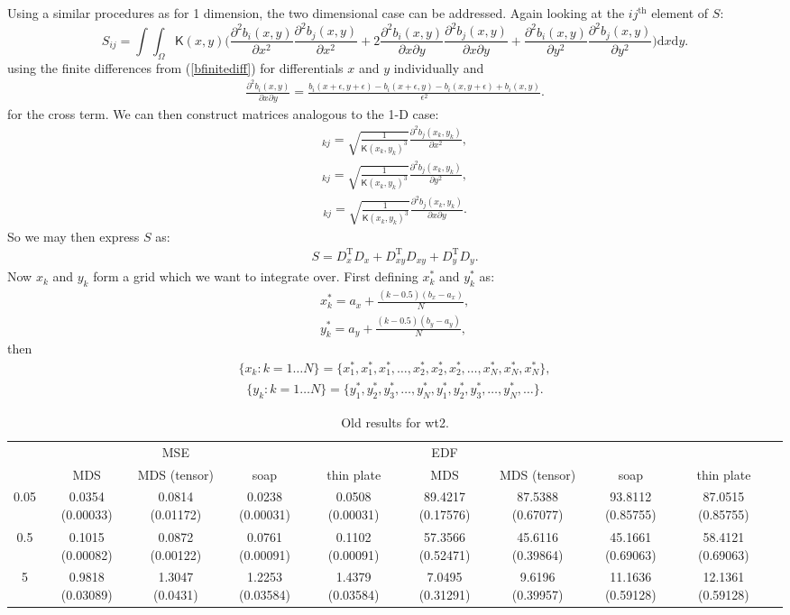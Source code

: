 \documentclass[a4paper,10pt]{article}
\newcommand{\eqn}[1]{(\ref{#1})}
\newcommand{\tr}[1]{#1^{\text{T}}}
\newcommand{\be}{\begin{eqnarray}}
\newcommand{\ee}{\end{eqnarray}}
\begin{document}
Using a similar procedures as for 1 dimension, the two dimensional case can be addressed. Again looking at the $ij^\text{th}$ element of $S$:
\begin{equation}
S_{ij}=\int\int_\Omega \mathsf{K}(x,y) \Big( \frac{\partial^2 b_i(x,y)}{\partial x^2}\frac{\partial^2 b_j(x,y)}{\partial x^2}+2\frac{\partial^2 b_i(x,y)}{\partial x \partial y}\frac{\partial^2 b_j(x,y)}{\partial x \partial y}+\frac{\partial^2 b_i(x,y)}{\partial y^2}\frac{\partial^2 b_j(x,y)}{\partial y^2} \Big) \text{d}x\text{d}y.
\label{kdeadjust}
\end{equation}
using the finite differences from \eqn{bfinitediff} for differentials $x$ and $y$ individually and
\be
\frac{\partial^2 b_i(x,y)}{\partial x \partial y} = \frac{ b_i(x+\epsilon,y+\epsilon) - b_i(x+\epsilon,y) - b_i(x,y+\epsilon) + b_i(x,y)}{\epsilon^2}.
\ee
for the cross term. We can then construct matrices analogous to the 1-D case:
\be
[D_x]_{kj}=\sqrt{\frac{1}{\mathsf{K}(x_k,y_k)^3}} \frac{\partial^2 b_j(x_k,y_k)}{\partial x^2},
\ee
\be
[D_y]_{kj}=\sqrt{\frac{1}{\mathsf{K}(x_k,y_k)^3}} \frac{\partial^2 b_j(x_k,y_k)}{\partial y^2},
\ee
\be
[D_{xy}]_{kj}=\sqrt{\frac{1}{\mathsf{K}(x_k,y_k)^3}} \frac{\partial^2 b_j(x_k,y_k)}{\partial x \partial y}.
\ee
So we may then express $S$ as:
\be
S=\tr{D_x}D_x + \tr{D_{xy}}D_{xy} + \tr{D_y}D_y.
\ee
Now $x_k$ and $y_k$ form a grid which we want to integrate over. First defining $x^*_k$ and $y^*_k$ as:
\be
x^*_k=a_x+\frac{(k-0.5)(b_x-a_x)}{N},\\
y^*_k=a_y+\frac{(k-0.5)(b_y-a_y)}{N},
\ee
then
\be
\{x_k : k=1\dots N\} = \{x^*_1,x^*_1,x^*_1,\dots, x^*_2, x^*_2, x^*_2,\dots, x^*_N, x^*_N, x^*_N\},
\ee
\be
\{y_k : k=1\dots N\} = \{y^*_1,y^*_2, y^*_3,\dots, y^*_N,y^*_1,y^*_2, y^*_3,\dots, y^*_N,\dots\}.
\ee








\begin{table}[ht]
\centering
\begin{tabular}{c c c c c c c c c c}
 & & MSE & &  & EDF & \\ 
 & MDS & MDS (tensor) & soap & thin plate & MDS & MDS (tensor) & soap & thin plate\\ 
0.05  & 0.0354 (0.00033) & 0.0814 (0.01172) & 0.0238 (0.00031) &0.0508 (0.00031) &89.4217 (0.17576) & 87.5388 (0.67077) & 93.8112 (0.85755) & 87.0515 (0.85755)\\ 
0.5  & 0.1015 (0.00082) & 0.0872 (0.00122) & 0.0761 (0.00091) &0.1102 (0.00091) &57.3566 (0.52471) & 45.6116 (0.39864) & 45.1661 (0.69063) & 58.4121 (0.69063)\\ 
5  & 0.9818 (0.03089) & 1.3047 (0.0431) & 1.2253 (0.03584) &1.4379 (0.03584) &7.0495 (0.31291) & 9.6196 (0.39957) & 11.1636 (0.59128) & 12.1361 (0.59128)\\ 
\end{tabular}
\caption{Old results for wt2.}
\end{table}
\end{document}
